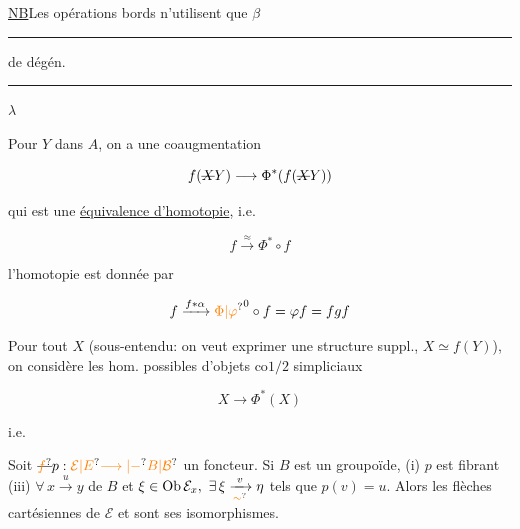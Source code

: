 \uline{NB}\quad Les opérations bords n'utilisent que \(\beta\)

\hspace{3em}\rule{4em}{0.4pt}\quad de dégén.\quad\rule{7em}{0.4pt}\(\lambda\)

Pour  \(Y\) dans \(A\), on a une coaugmentation

\[
f(\deleted{X}Y)\longrightarrow\Phi^*(f(\deleted{X}Y))
\]

qui est une \uline{équivalence d'homotopie}, i.e.

\[
f\xrightarrow{\approx}\Phi^*\circ f
\]

l'homotopie est donnée par

\[
f\xrightarrow{f*\alpha}{\unsure{\Phi|\varphi}}^0\circ f=\varphi f=fgf
\]

Pour tout \(X\) (sous-entendu: on veut exprimer une structure suppl.,   \(X\simeq f(Y)\)), on considère les hom. possibles d'objets co\(1/2\) simpliciaux

\[
X\longrightarrow\Phi^*(X)
\]


i.e.


\noindent{}

Soit \(\deleted{\unsure{f}}p:\unsure{\mathcal E|E}\unsure{\longrightarrow|-}\unsure{B|\mathcal B}\) un foncteur. Si \(B\) est un groupoïde,  (i) \(p\) est fibrant    (iii) \(\forall\,x\xrightarrow{u}y\) de \(B\) \deleted{\(\unsure{\beta}\longrightarrow\unsure{\beta}\)} et \(\xi\in\operatorname{Ob}\mathcal E_x,\ \exists\,\xi\xrightarrow[\unsure{\sim}]{v}\eta\) tels que \(p(v)=u\).  Alors les flèches cartésiennes  de \(\mathcal E\) et sont  ses isomorphismes.

